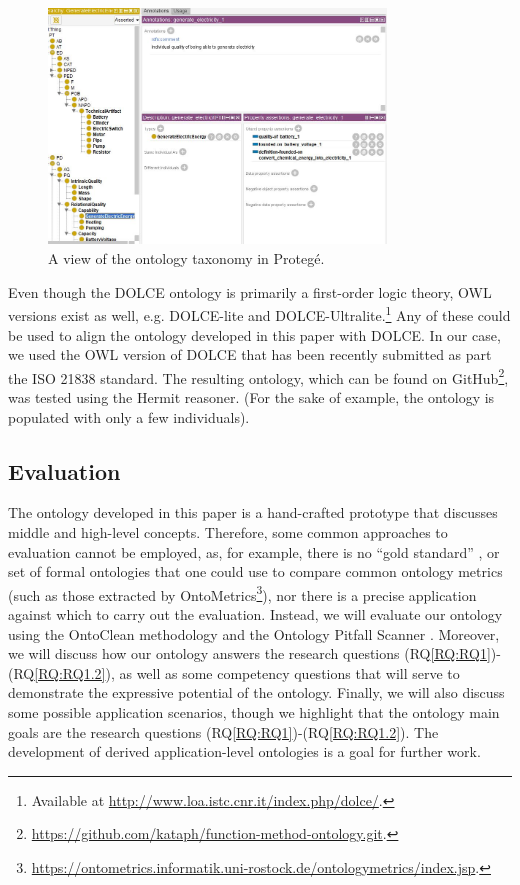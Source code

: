 \documentclass[sw]{iosart2x}
\newcommand{\RQLabel}{\textrm{RQ}}
\newcommand{\refRQ}[1]{({\RQLabel}\ref{#1})}
\newcommand{\DOLCE}{\textsc{DOLCE}\xspace} %
\newcommand{\OWL}{\textnormal{OWL}\xspace}
\newcommand{\qquotes}[1]{``#1''}
\begin{document}
\begin{figure}
  \centering
  \includegraphics[width=0.8\textwidth]{entities_screenshotv2.JPG}
  \caption{A view of the ontology taxonomy in Protegé.\label{fig:screen_entities}}
\end{figure}

Even though the \DOLCE ontology is primarily a first-order logic theory, \OWL versions exist as well, e.g. \DOLCE-lite and \DOLCE-Ultralite.\footnote{Available at \url{http://www.loa.istc.cnr.it/index.php/dolce/}.}
Any of these could be used to align the ontology developed in this paper with \DOLCE. In our case, we used the \OWL version of \DOLCE that has been recently submitted as part the ISO 21838 standard. 
The resulting ontology, which can be found on GitHub\footnote{\url{https://github.com/kataph/function-method-ontology.git}.}, was tested using the Hermit reasoner.
(For the sake of example, the ontology is populated with only a few individuals).


\subsection{Evaluation}
The ontology developed in this paper is a hand-crafted prototype that discusses middle and high-level concepts. 
Therefore, some common approaches to evaluation cannot be employed, as, for example, there is no \qquotes{gold standard} \cite{sfarGoldStandardBased2016}, or set of formal ontologies that one could use to compare common ontology metrics (such as those extracted by OntoMetrics\footnote{\url{https://ontometrics.informatik.uni-rostock.de/ontologymetrics/index.jsp}.}), nor there is a precise application against which to carry out the evaluation. 
Instead, we will evaluate our ontology using the OntoClean methodology  \cite{guarinoOverviewOntoClean2009} and the Ontology Pitfall Scanner \cite{poveda2014oops}. 
Moreover, we will discuss how our ontology answers the research questions \refRQ{RQ:RQ1}-\refRQ{RQ:RQ1.2}, as well as some competency questions that will serve to demonstrate the expressive potential of the ontology.
Finally, we will also discuss some possible application scenarios, though we highlight that the ontology main goals are the research questions \refRQ{RQ:RQ1}-\refRQ{RQ:RQ1.2}. The development of derived application-level ontologies is a goal for further work.
\end{document}
